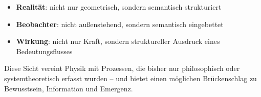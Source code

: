 \documentclass[11pt]{article}
\begin{document}
\begin{itemize}
  \item \textbf{Realität}: nicht nur geometrisch, sondern semantisch strukturiert
  \item \textbf{Beobachter}: nicht außenstehend, sondern semantisch eingebettet
  \item \textbf{Wirkung}: nicht nur Kraft, sondern struktureller Ausdruck eines Bedeutungsflusses
\end{itemize}

Diese Sicht vereint Physik mit Prozessen, die bisher nur philosophisch oder systemtheoretisch erfasst wurden –  
und bietet einen möglichen Brückenschlag zu Bewusstsein, Information und Emergenz.
\end{document}
